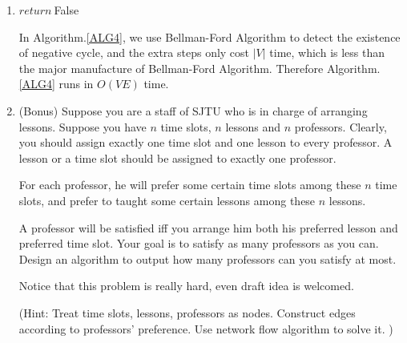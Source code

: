 \documentclass[12pt,a4paper]{article}
\makeatletter
\newtheorem*{solution}{Solution}
\theoremstyle{definition}
\renewenvironment{solution}[1][Solution] {\par\pushQED{\qed}\normalfont\topsep6\p@\@plus6\p@\relax\trivlist\item[\hskip\labelsep\bfseries#1\@addpunct{.}]\ignorespaces}{\popQED\endtrivlist\@endpefalse} \makeatother
\makeatother
\begin{document}
\begin{enumerate}
\begin{solution}
\begin{itemize}
\begin{minipage}[t]{0.8\textwidth}
\begin{algorithm}[H]
{{{{                            }
                        }
                    }
                }

            $return\ $False$ $\;
       \end{algorithm}
       \end{minipage}
       \hfill
       \par 
       In Algorithm.\ref{ALG4}, we use Bellman-Ford Algorithm to detect the existence of negative cycle, and the extra steps only cost $|V|$ time, which is less than the major manufacture of Bellman-Ford Algorithm. Therefore Algorithm.\ref{ALG4} runs in $O(VE)$ time.

\end{itemize}
\end{solution}

\item

\color{red}(Bonus)\color{black}
Suppose you are a staff of SJTU who is in charge of arranging lessons. Suppose you have $n$ time slots, $n$ lessons and $n$ professors. Clearly, you should assign exactly one time slot and one lesson to every professor. A lesson or a time slot should be assigned to exactly one professor. \par
For each professor, he will prefer some certain time slots among these $n$ time slots, and prefer to taught some certain lessons among these $n$ lessons.\par
A professor will be satisfied iff you arrange him both his preferred lesson and preferred time slot. Your goal is to satisfy as many professors as you can. Design an algorithm to output how many professors can you satisfy at most.\par 
Notice that this problem is really hard, even draft idea is welcomed.\par
(Hint: Treat time slots, lessons, professors as nodes. Construct edges according to professors' preference. Use network flow algorithm to solve it. )


\end{enumerate}
\end{document}

